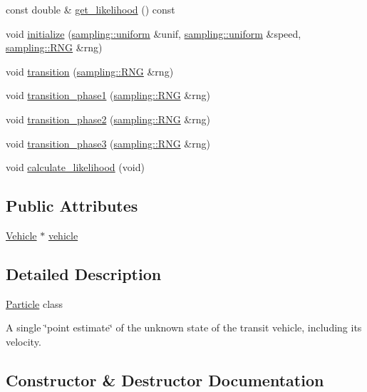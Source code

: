 \begin{DoxyCompactItemize}
\item 
const double \& \hyperlink{classgtfs_1_1Particle_a2e1a6de0b7d0fd6938ef3f7f9e5d4b99}{get\+\_\+likelihood} () const
\item 
void \hyperlink{classgtfs_1_1Particle_a4b1e356f32d4557d06c9ed59467a5b27}{initialize} (\hyperlink{classsampling_1_1uniform}{sampling\+::uniform} \&unif, \hyperlink{classsampling_1_1uniform}{sampling\+::uniform} \&speed, \hyperlink{classsampling_1_1RNG}{sampling\+::\+R\+NG} \&rng)
\item 
void \hyperlink{classgtfs_1_1Particle_a18aeb1ccbc395210f80c18f9d0a0095c}{transition} (\hyperlink{classsampling_1_1RNG}{sampling\+::\+R\+NG} \&rng)
\item 
void \hyperlink{classgtfs_1_1Particle_a5e964d5aa4698335de3c75938e55f5cd}{transition\+\_\+phase1} (\hyperlink{classsampling_1_1RNG}{sampling\+::\+R\+NG} \&rng)
\item 
void \hyperlink{classgtfs_1_1Particle_ad9374830814c89b2d5c0af705bda8849}{transition\+\_\+phase2} (\hyperlink{classsampling_1_1RNG}{sampling\+::\+R\+NG} \&rng)
\item 
void \hyperlink{classgtfs_1_1Particle_a68043b2380d8f530d648dd99e5a85101}{transition\+\_\+phase3} (\hyperlink{classsampling_1_1RNG}{sampling\+::\+R\+NG} \&rng)
\item 
void \hyperlink{classgtfs_1_1Particle_a88627efbe0eb2e289315ae82627d3a39}{calculate\+\_\+likelihood} (void)
\end{DoxyCompactItemize}
\subsection*{Public Attributes}
\begin{DoxyCompactItemize}
\item 
\hyperlink{classgtfs_1_1Vehicle}{Vehicle} $\ast$ \hyperlink{classgtfs_1_1Particle_a81c313d505ecb592d79463f167dfb76c}{vehicle}
\end{DoxyCompactItemize}


\subsection{Detailed Description}
\hyperlink{classgtfs_1_1Particle}{Particle} class

A single \char`\"{}point estimate\char`\"{} of the unknown state of the transit vehicle, including its velocity. 

\subsection{Constructor \& Destructor Documentation}
\mbox{\label{classgtfs_1_1Particle_ad7f42e77c6c7f3042c977fd5a42ff82f}} 
